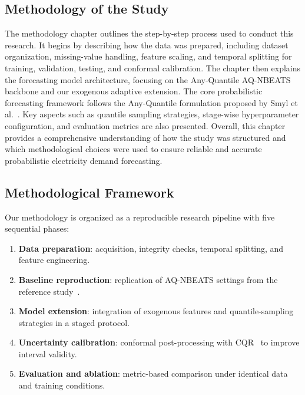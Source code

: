 \begin{center}
    \chapter{Methodology of the Study}
\end{center}
\label{chap:methodology}

\noindent
The methodology chapter outlines the step-by-step process used to conduct
this research. It begins by describing how the data was prepared, including
dataset organization, missing-value handling, feature scaling, and temporal
splitting for training, validation, testing, and conformal calibration.
The chapter then explains the forecasting model architecture, focusing on
the Any-Quantile AQ-NBEATS backbone and our exogenous adaptive extension.
The core probabilistic forecasting framework follows the Any-Quantile
formulation proposed by Smyl et al.~\cite{smyl2025anyquantile}.
Key aspects such as quantile sampling strategies, stage-wise hyperparameter
configuration, and evaluation metrics are also presented. Overall, this
chapter provides a comprehensive understanding of how the study was
structured and which methodological choices were used to ensure reliable
and accurate probabilistic electricity demand forecasting.

\section{Methodological Framework}
\label{sec:method_framework}

Our methodology is organized as a reproducible research pipeline with five
sequential phases:

\begin{enumerate}
  \item \textbf{Data preparation}: acquisition, integrity checks,
        temporal splitting, and feature engineering.
  \item \textbf{Baseline reproduction}: replication of AQ-NBEATS settings
        from the reference study~\cite{smyl2025anyquantile}.
  \item \textbf{Model extension}: integration of exogenous features and
        quantile-sampling strategies in a staged protocol.
  \item \textbf{Uncertainty calibration}: conformal post-processing with
        CQR~\cite{romano2019cqr} to improve interval validity.
  \item \textbf{Evaluation and ablation}: metric-based comparison under
        identical data and training conditions.
\end{enumerate}

